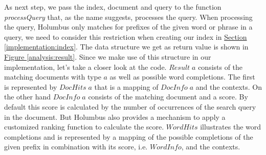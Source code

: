 \documentclass[%
	pdftex,%
	a4paper,%
	oneside,%
	chapterprefix,%
	headsepline,%
	12pt%
]{scrbook}
\newcommand{\Conid}[1]{\mathit{#1}}
\newcommand{\Varid}[1]{\mathit{#1}}
\begin{document}
As next step, we pass the index, document and query to the function
\emph{processQuery} that, as the name suggests, processes the query. %
When processing the query, Holumbus only matches for prefixes of the
given word or phrase in a query, we need to consider this restriction
when creating our index in \hyperref[implementation:index]{Section
  \ref{implementation:index}}. %
The data structure we get as return value is shown in
\hyperref[analysis:result]{Figure \ref{analysis:result}}. %
Since we make use of this structure in our implementation, let's take
a closer look at the code. %
\ensuremath{\Conid{Result}\;\Varid{a}} consists of the matching documents with type \ensuremath{\Varid{a}} as well as
possible word completions. %
The first is represented by \ensuremath{\Conid{DocHits}\;\Varid{a}} that is a mapping of \ensuremath{\Conid{DocInfo}\;\Varid{a}} and the contexts. %
On the other hand \ensuremath{\Conid{DocInfo}\;\Varid{a}} consists of the matching document and a
score. %
By default this score is calculated by the number of occurrences of
the search query in the document. %
But Holumbus also provides a mechanism to apply a customized ranking
function to calculate the score. %
\ensuremath{\Conid{WordHits}} illustrates the word completions and is represented by a
mapping of the possible completions of the given prefix in combination
with its score, i.e. \ensuremath{\Conid{WordInfo}}, and the contexts.\\
\end{document}
